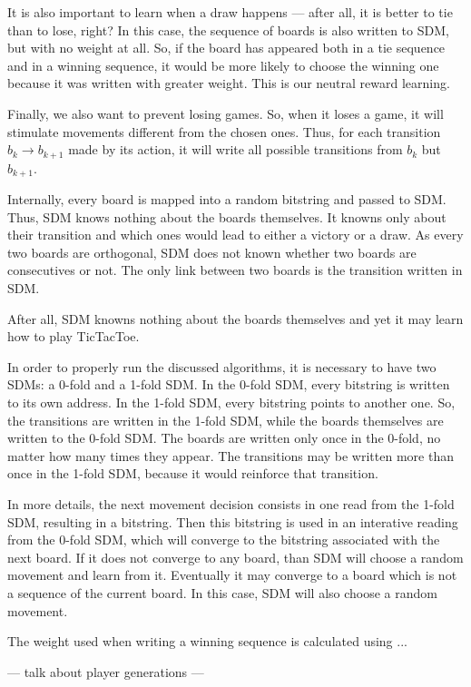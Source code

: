 It is also important to learn when a draw happens --- after all, it is better to tie than to lose, right? In this case, the sequence of boards is also written to SDM, but with no weight at all. So, if the board has appeared both in a tie sequence and in a winning sequence, it would be more likely to choose the winning one because it was written with greater weight. This is our neutral reward learning.

Finally, we also want to prevent losing games. So, when it loses a game, it will stimulate movements different from the chosen ones. Thus, for each transition $b_k \rightarrow b_{k+1}$ made by its action, it will write all possible transitions from $b_k$ but $b_{k+1}$.

Internally, every board is mapped into a random bitstring and passed to SDM. Thus, SDM knows nothing about the boards themselves. It knowns only about their transition and which ones would lead to either a victory or a draw. As every two boards are orthogonal, SDM does not known whether two boards are consecutives or not. The only link between two boards is the transition written in SDM.

After all, SDM knowns nothing about the boards themselves and yet it may learn how to play TicTacToe.

In order to properly run the discussed algorithms, it is necessary to have two SDMs: a 0-fold and a 1-fold SDM. In the 0-fold SDM, every bitstring is written to its own address. In the 1-fold SDM, every bitstring points to another one. So, the transitions are written in the 1-fold SDM, while the boards themselves are written to the 0-fold SDM. The boards are written only once in the 0-fold, no matter how many times they appear. The transitions may be written more than once in the 1-fold SDM, because it would reinforce that transition.

In more details, the next movement decision consists in one read from the 1-fold SDM, resulting in a bitstring. Then this bitstring is used in an interative reading from the 0-fold SDM, which will converge to the bitstring associated with the next board. If it does not converge to any board, than SDM will choose a random movement and learn from it. Eventually it may converge to a board which is not a sequence of the current board. In this case, SDM will also choose a random movement.

The weight used when writing a winning sequence is calculated using ...

--- talk about player generations ---

